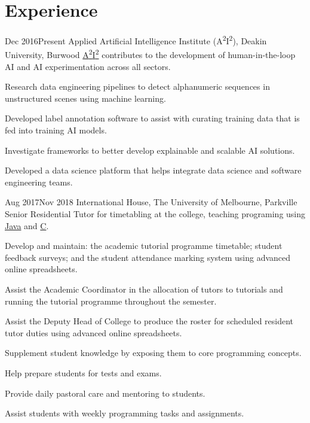 \section{Experience}

\def \asis{A\textsuperscript{2}I\textsuperscript{2}}

{Dec 2016}{Present}
{Applied Artificial Intelligence Institute (\asis), Deakin University, Burwood}
{\href{http://a2i2.ai}{\asis} contributes to the development of human-in-the-loop AI and AI experimentation across all sectors.}
{
  \item Research data engineering pipelines to detect alphanumeric sequences in unstructured scenes using machine learning.
  \item Developed label annotation software to assist with curating training data that is fed into training AI models.
  \item Investigate frameworks to better develop explainable and scalable AI solutions.
  \item Developed a data science platform that helps integrate data science and software engineering teams.
}

{Aug 2017}{Nov 2018}
{International House, The University of Melbourne, Parkville}
{Senior Residential Tutor for timetabling at the college, teaching programing using \href{https://handbook.unimelb.edu.au/2017/subjects/swen20003}{Java} and \href{https://handbook.unimelb.edu.au/2018/subjects/comp20005}{C}.}
{
  \item Develop and maintain: the academic tutorial programme timetable; student feedback surveys; and the student attendance marking system using advanced online spreadsheets.
  \item Assist the Academic Coordinator in the allocation of tutors to tutorials and running the tutorial programme throughout the semester.
  \item Assist the Deputy Head of College to produce the roster for scheduled resident tutor duties using advanced online spreadsheets.
  \item Supplement student knowledge by exposing them to core programming concepts.
  \item Help prepare students for tests and exams.
  \item Provide daily pastoral care and mentoring to students.
  \item Assist students with weekly programming tasks and assignments.
}

